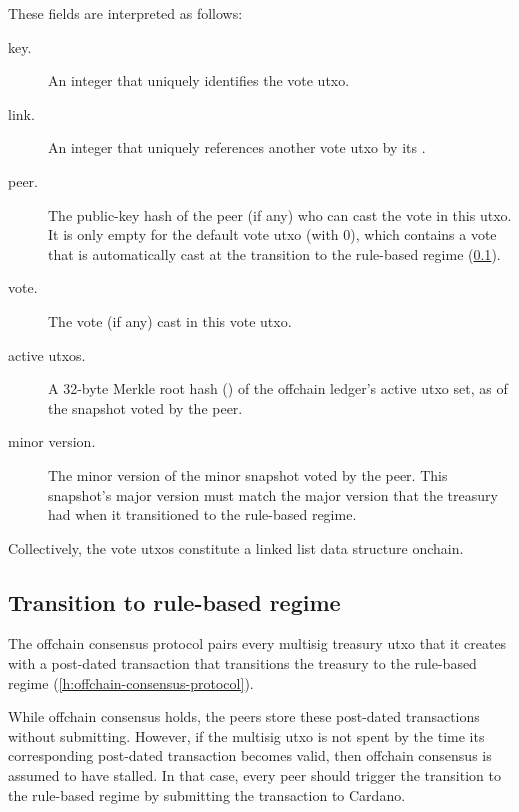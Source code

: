 \documentclass[../hydrozoa.tex]{subfiles}
\begin{document}
These fields are interpreted as follows:
\begin{description}
  \item[key.] An integer that uniquely identifies the vote utxo.
  \item[link.] An integer that uniquely references another vote utxo by its .
  \item[peer.] The public-key hash of the peer (if any) who can cast the vote in this utxo. It is only empty for the default vote utxo (with  0), which contains a vote that is automatically cast at the transition to the rule-based regime (\cref{h:rule-based-transition}).
  \item[vote.] The vote (if any) cast in this vote utxo.
  \item[active utxos.] A 32-byte Merkle root hash () of the offchain ledger's active utxo set, as of the snapshot voted by the peer.
  \item[minor version.] The minor version of the minor snapshot voted by the peer. This snapshot's major version must match the major version that the treasury had when it transitioned to the rule-based regime.
\end{description}

Collectively, the vote utxos constitute a linked list data structure onchain.

\subsection{Transition to rule-based regime}%
\label{h:rule-based-transition}

The offchain consensus protocol pairs every multisig treasury utxo that it creates with a post-dated transaction that transitions the treasury to the rule-based regime (\cref{h:offchain-consensus-protocol}).

While offchain consensus holds, the peers store these post-dated transactions without submitting.
However, if the multisig utxo is not spent by the time its corresponding post-dated transaction becomes valid, then offchain consensus is assumed to have stalled.
In that case, every peer should trigger the transition to the rule-based regime by submitting the transaction to Cardano.
\end{document}
